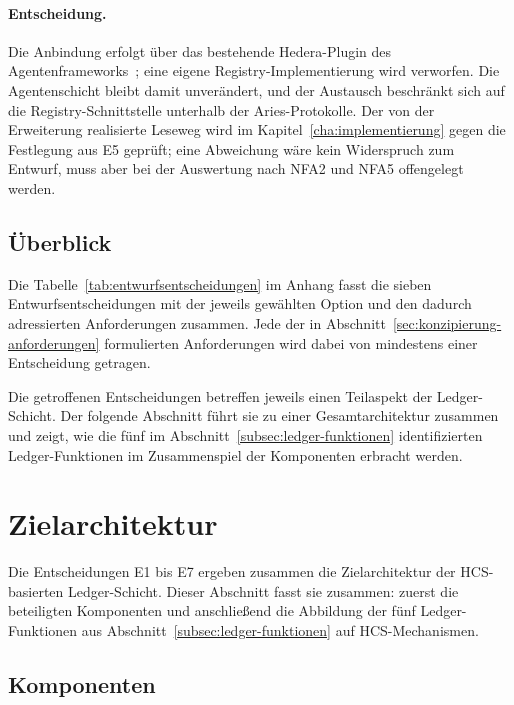 \paragraph{Entscheidung.}
Die Anbindung erfolgt über das bestehende Hedera-Plugin des Agentenframeworks~\cite{acapyhedera}; eine eigene Registry-Implementierung wird verworfen. Die Agentenschicht bleibt damit unverändert, und der Austausch beschränkt sich auf die Registry-Schnittstelle unterhalb der Aries-Protokolle. Der von der Erweiterung realisierte Leseweg wird im Kapitel~\ref{cha:implementierung} gegen die Festlegung aus E5 geprüft; eine Abweichung wäre kein Widerspruch zum Entwurf, muss aber bei der Auswertung nach NFA2 und NFA5 offengelegt werden.


\subsection{Überblick}
\label{subsec:entwurf-ueberblick}

Die Tabelle~\ref{tab:entwurfsentscheidungen} im Anhang fasst die sieben Entwurfsentscheidungen mit der jeweils gewählten Option und den dadurch adressierten Anforderungen zusammen. Jede der in Abschnitt~\ref{sec:konzipierung-anforderungen} formulierten Anforderungen wird dabei von mindestens einer Entscheidung getragen.

Die getroffenen Entscheidungen betreffen jeweils einen Teilaspekt der Ledger-Schicht. Der folgende Abschnitt führt sie zu einer Gesamtarchitektur zusammen und zeigt, wie die fünf im Abschnitt~\ref{subsec:ledger-funktionen} identifizierten Ledger-Funktionen im Zusammenspiel der Komponenten erbracht werden.

\section{Zielarchitektur}
\label{sec:konzipierung-zielarchitektur}

Die Entscheidungen E1 bis E7 ergeben zusammen die Zielarchitektur der HCS-basierten Ledger-Schicht. Dieser Abschnitt fasst sie zusammen: zuerst die beteiligten Komponenten und anschließend die Abbildung der fünf Ledger-Funktionen aus Abschnitt~\ref{subsec:ledger-funktionen} auf HCS-Mechanismen.

\subsection{Komponenten}
\label{subsec:zielarchitektur-komponenten}

